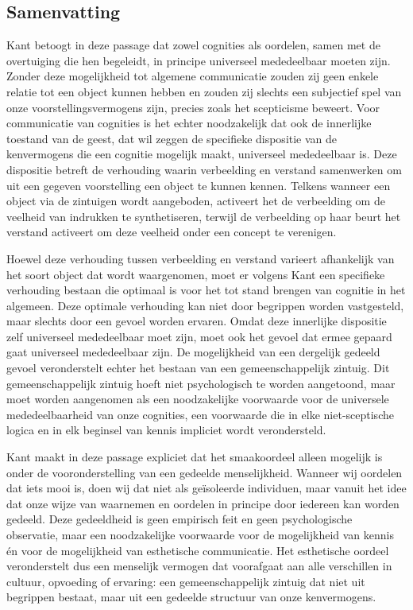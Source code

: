 \begin{mdframed}[leftmargin=0pt,rightmargin=0pt,backgroundcolor=blue!6,linecolor=white,innertopmargin=6pt,innerbottommargin=6pt]
\section*{Samenvatting}

Kant betoogt in deze passage dat zowel cognities als oordelen, samen met de overtuiging die hen begeleidt, in principe universeel mededeelbaar moeten zijn. Zonder deze mogelijkheid tot algemene communicatie zouden zij geen enkele relatie tot een object kunnen hebben en zouden zij slechts een subjectief spel van onze voorstellingsvermogens zijn, precies zoals het scepticisme beweert. Voor communicatie van cognities is het echter noodzakelijk dat ook de innerlijke toestand van de geest, dat wil zeggen de specifieke dispositie van de kenvermogens die een cognitie mogelijk maakt, universeel mededeelbaar is. Deze dispositie betreft de verhouding waarin verbeelding en verstand samenwerken om uit een gegeven voorstelling een object te kunnen kennen. Telkens wanneer een object via de zintuigen wordt aangeboden, activeert het de verbeelding om de veelheid van indrukken te synthetiseren, terwijl de verbeelding op haar beurt het verstand activeert om deze veelheid onder een concept te verenigen.

Hoewel deze verhouding tussen verbeelding en verstand varieert afhankelijk van het soort object dat wordt waargenomen, moet er volgens Kant een specifieke verhouding bestaan die optimaal is voor het tot stand brengen van cognitie in het algemeen. Deze optimale verhouding kan niet door begrippen worden vastgesteld, maar slechts door een gevoel worden ervaren. Omdat deze innerlijke dispositie zelf universeel mededeelbaar moet zijn, moet ook het gevoel dat ermee gepaard gaat universeel mededeelbaar zijn. De mogelijkheid van een dergelijk gedeeld gevoel veronderstelt echter het bestaan van een gemeenschappelijk zintuig. Dit gemeenschappelijk zintuig hoeft niet psychologisch te worden aangetoond, maar moet worden aangenomen als een noodzakelijke voorwaarde voor de universele mededeelbaarheid van onze cognities, een voorwaarde die in elke niet-sceptische logica en in elk beginsel van kennis impliciet wordt verondersteld.

\bigskip
Kant maakt in deze passage expliciet dat het smaakoordeel alleen mogelijk is onder de vooronderstelling van een gedeelde menselijkheid. Wanneer wij oordelen dat iets mooi is, doen wij dat niet als geïsoleerde individuen, maar vanuit het idee dat onze wijze van waarnemen en oordelen in principe door iedereen kan worden gedeeld. Deze gedeeldheid is geen empirisch feit en geen psychologische observatie, maar een noodzakelijke voorwaarde voor de mogelijkheid van kennis én voor de mogelijkheid van esthetische communicatie. Het esthetische oordeel veronderstelt dus een menselijk vermogen dat voorafgaat aan alle verschillen in cultuur, opvoeding of ervaring: een gemeenschappelijk zintuig dat niet uit begrippen bestaat, maar uit een gedeelde structuur van onze kenvermogens.


\end{mdframed}

